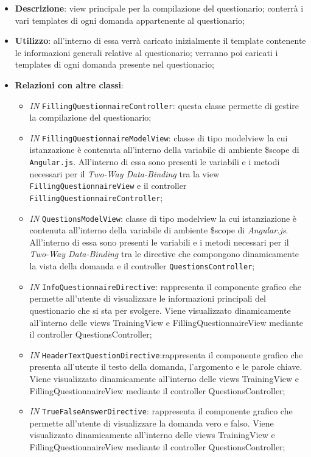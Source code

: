 \begin{itemize}
	\item \textbf{Descrizione}: view principale per la compilazione del questionario; conterrà i vari templates di ogni domanda appartenente al questionario;
	\item \textbf{Utilizzo}: all'interno di essa verrà caricato inizialmente il template contenente le informazioni generali relative al questionario; verranno poi caricati i templates di ogni domanda presente nel questionario;
	\item \textbf{Relazioni con altre classi}: 
	\begin{itemize}
		\item \textit{IN} \texttt{FillingQuestionnaireController}: questa classe permette di gestire la compilazione del questionario;
		\item \textit{IN} \texttt{FillingQuestionnaireModelView}: classe di tipo modelview la cui istanzazione è contenuta all'interno della variabile di ambiente \$scope di \texttt{Angular.js}. All'interno di essa sono presenti le variabili e i metodi necessari per il \textit{Two-Way Data-Binding} tra la view \texttt{FillingQuestionnaireView} e il controller \texttt{FillingQuestionnaireController};
		\item \textit{IN} \texttt{QuestionsModelView}: classe di tipo modelview la cui istanziazione è contenuta all'interno della variabile di ambiente \$scope di \textit{Angular.js}. All'interno di essa sono presenti le variabili e i metodi necessari per il \textit{Two-Way Data-Binding} tra le directive che compongono dinamicamente la vista della domanda e il controller \texttt{QuestionsController};
		\item \textit{IN} \texttt{InfoQuestionnaireDirective}: rappresenta il componente grafico che permette all'utente di visualizzare le informazioni principali del questionario che si sta per svolgere. Viene visualizzato dinamicamente all'interno delle views TrainingView e FillingQuestionnaireView mediante il controller QuestionsController;
		\item \textit{IN} \texttt{HeaderTextQuestionDirective}:rappresenta il componente grafico che presenta all'utente il testo della domanda, l'argomento e le parole chiave. Viene visualizzato dinamicamente all'interno delle views TrainingView e FillingQuestionnaireView mediante il controller QuestionsController;
		\item \textit{IN} \texttt{TrueFalseAnswerDirective}: rappresenta il componente grafico che permette all'utente di visualizzare la domanda vero e falso. Viene visualizzato dinamicamente all'interno delle views TrainingView e FillingQuestionnaireView mediante il controller QuestionsController;

\end{itemize}
\end{itemize}
